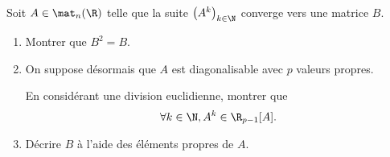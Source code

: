 \begin{enonce}
\begin{exercise}[ID={RMS135 E885},subtitle={Mines-Ponts PSI 2024},tags={oraux},difficulty={}]
  Soit $A\in\mat_n(\R)$ telle que la suite $\left( A^k \right)_{k\in\N}$ converge vers une matrice $B$.

  \begin{enumerate}
    \item Montrer que $B^2 = B$.

    \item On suppose désormais que $A$ est diagonalisable avec $p$ valeurs propres.

      En considérant une division euclidienne, montrer que
      \begin{equation*}
        \forall k\in\N, A^k \in\R_{p-1}[A].
      \end{equation*}

      \item Décrire $B$ à l'aide des éléments propres de $A$.
  \end{enumerate}
\end{exercise}
\begin{solution}
\end{solution}
\end{enonce}
